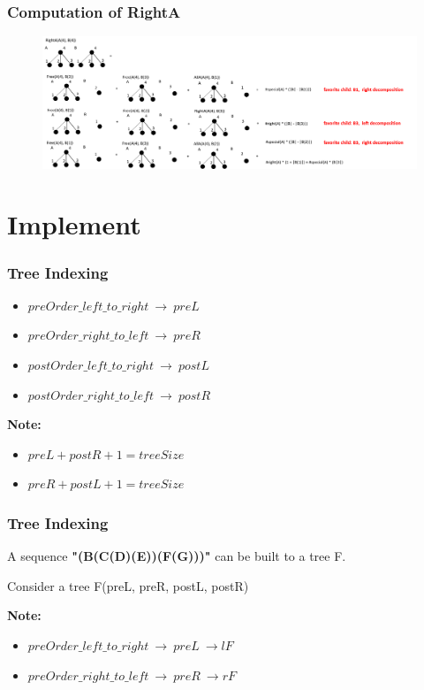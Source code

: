 \documentclass{beamer}
\begin{document}
\begin{frame}
\frametitle{Computation of RightA}
\begin{figure}
	\includegraphics[width=1.0\linewidth]{RightA_4_4}
	\label{RightA_4_4} 
	\centering
\end{figure}

\end{frame}

\section{Implement}
\begin{frame}
\frametitle{Tree Indexing}
\begin{itemize}
\item $preOrder\_left\_to\_right\ \to\ preL\ $
\item $preOrder\_right\_to\_left\ \to\ preR\ $
\item $postOrder\_left\_to\_right\ \to\ postL\ $
\item $postOrder\_right\_to\_left\ \to\ postR\ $
\end{itemize}
\textbf{Note:}
\begin{itemize}
\item $preL + postR + 1 = treeSize$
\item $preR + postL + 1 = treeSize$
\end{itemize}
\end{frame}
\begin{frame}
\frametitle{Tree Indexing}
A sequence \textbf{"(B(C(D)(E))(F(G)))"} can be built to a tree F.

Consider a tree F(preL, preR, postL, postR)

\begingroup

\centering
{}

\endgroup

\textbf{Note:}
\begin{itemize}
\item $preOrder\_left\_to\_right\ \to\ preL\ \to lF$
\item $preOrder\_right\_to\_left\ \to\ preR\ \to rF$
\end{itemize}

\end{frame}
\end{document}
